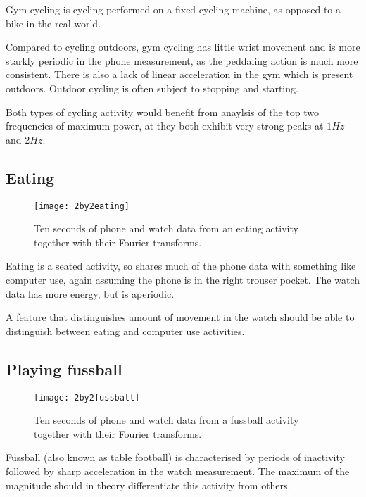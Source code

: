       Gym cycling is cycling performed on a fixed cycling machine, as opposed to a bike in the real world.
      
      Compared to cycling outdoors, gym cycling has little wrist movement and is more starkly periodic in the phone measurement, as the peddaling action is much more consistent. There is also a lack of linear acceleration in the gym which is present outdoors. Outdoor cycling is often subject to stopping and starting.
      
      Both types of cycling activity would benefit from anaylsis of the top two frequencies of maximum power, at they both exhibit very strong peaks at $1 \si{Hz}$ and $2 \si{Hz}$.
    \pagebreak[4]
    \subsection{Eating}
      \begin{figure}[!th]
        \centering
        \texttt{[image: 2by2eating]}
        \caption[Eating sample]{Ten seconds of phone and watch data from an eating activity together with their Fourier transforms.}
        \label{fig:2by2eating}
      \end{figure}
      
      Eating is a seated activity, so shares much of the phone data with something like computer use, again assuming the phone is in the right trouser pocket. The watch data has more energy, but is aperiodic.
      
      A feature that distinguishes amount of movement in the watch should be able to distinguish between eating and computer use activities.
    \pagebreak[4]
    \subsection{Playing fussball}
      \begin{figure}[!th]
        \centering
        \texttt{[image: 2by2fussball]}
        \caption[Fussball sample]{Ten seconds of phone and watch data from a fussball activity together with their Fourier transforms.}
        \label{fig:2by2fussball}
      \end{figure}
      
      Fussball (also known as table football) is characterised by periods of inactivity followed by sharp acceleration in the watch measurement. The maximum of the magnitude should in theory differentiate this activity from others.
      

